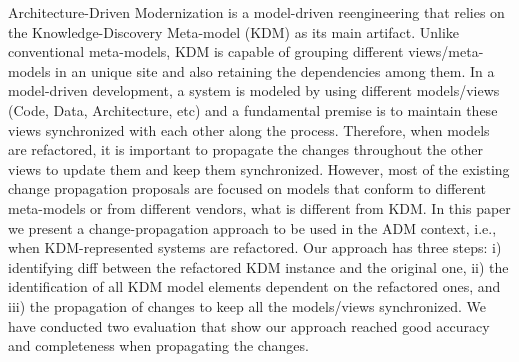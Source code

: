 %
Architecture-Driven Modernization is a model-driven reengineering that relies on the Knowledge-Discovery Meta-model (KDM) as its main artifact. Unlike conventional meta-models, KDM is capable of grouping different  views/meta-models in an unique site and also retaining the dependencies among them. In a model-driven development, a system is modeled by using different models/views (Code, Data, Architecture, etc) and a fundamental premise is to maintain these views synchronized with each other along the process. Therefore, when models are refactored, it is important to propagate the changes throughout the other views to update them and keep them synchronized. However, most of the existing change propagation proposals are focused on models that conform to different meta-models or from different vendors, what is different from KDM. In this paper we present a change-propagation  approach to be used in the ADM context, i.e., when KDM-represented systems are refactored. Our approach has three steps: i) identifying diff between the refactored KDM instance and the original one, ii) the identification of all KDM model elements dependent on the refactored ones, and iii) the propagation of changes to keep all the models/views synchronized. We have conducted two evaluation that show our approach reached good accuracy and completeness when propagating the changes.